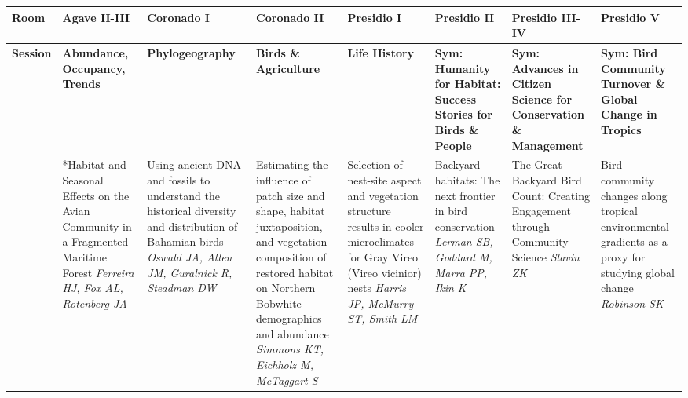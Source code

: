 \begin{tabular}{|x{0.85cm}|x{2.85cm}|x{2.85cm}|x{2.85cm}|x{2.85cm}|a{2.85cm}|a{2.85cm}|a{2.85cm}|}\hline
Room & Agave II-III & Coronado I & Coronado II & Presidio I & Presidio II & Presidio III-IV & Presidio V\\
\hline
\rule{0pt}{1em} \textbf{Session} &\footnotesize \textbf{Abundance, Occupancy, Trends} & \footnotesize \textbf{Phylogeography} & \footnotesize \textbf{Birds \& Agriculture} & \footnotesize \textbf{Life History} & \footnotesize \textbf{Sym: Humanity for Habitat: Success Stories for Birds \& People} & \footnotesize \textbf{Sym: Advances in Citizen Science for Conservation \& Management} & \footnotesize \textbf{Sym: Bird Community Turnover \& Global Change in Tropics}\\
\hline
{}&*Habitat and Seasonal Effects on the Avian Community in a Fragmented Maritime Forest \newline \newline \textit{Ferreira HJ, Fox AL, Rotenberg JA} & Using ancient DNA and fossils to understand the historical diversity and distribution of Bahamian birds \newline \newline \textit{Oswald JA, Allen JM, Guralnick R, Steadman DW} & Estimating the influence of patch size and shape, habitat juxtaposition, and vegetation composition of restored habitat on Northern Bobwhite demographics and abundance \newline \newline \textit{Simmons KT, Eichholz M, McTaggart S} & Selection of nest-site aspect and vegetation structure results in cooler microclimates for Gray Vireo (Vireo vicinior) nests \newline \newline \textit{Harris JP, McMurry ST, Smith LM} & Backyard habitats: The next frontier in bird conservation \newline \newline \textit{Lerman SB, Goddard M, Marra PP, Ikin K} & The Great Backyard Bird Count: Creating Engagement through Community Science \newline \newline \textit{Slavin ZK} & Bird community changes along tropical environmental gradients as a proxy for studying global change \newline \newline \textit{Robinson SK}\\
\hline

\end{tabular}
